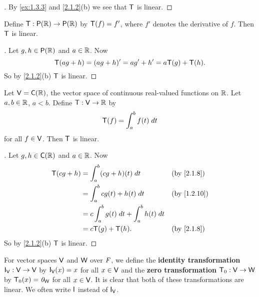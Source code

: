 \begin{proof}[]
  By \cref{ex:1.3.3} and \cref{2.1.2}(b) we see that \(\mathsf{T}\) is linear.
\end{proof}

\begin{eg}\label{2.1.7}
  Define \(\T : \ps{\R} \to \ps{\R}\) by \(\mathsf{T}(f) = f'\), where \(f'\) denotes the derivative of \(f\).
  Then \(\mathsf{T}\) is linear.
\end{eg}

\begin{proof}[]
  Let \(g, h \in \ps{\R}\) and \(a \in \mathbb{R}\).
  Now
  \[
    \mathsf{T}(ag + h) = (ag + h)' = ag' + h' = a\mathsf{T}(g) + \mathsf{T}(h).
  \]
  So by \cref{2.1.2}(b) \(\mathsf{T}\) is linear.
\end{proof}

\begin{eg}\label{2.1.8}
  Let \(\V = \cfs(\R)\), the vector space of continuous real-valued functions on \(\mathbb{R}\).
  Let \(a, b \in \mathbb{R}\), \(a < b\).
  Define \(\mathsf{T} : \mathsf{V} \to \mathbb{R}\) by
  \[
    \mathsf{T}(f) = \int_a^b f(t) \; dt
  \]
  for all \(f \in \mathsf{V}\).
  Then \(\mathsf{T}\) is linear.
\end{eg}

\begin{proof}[]
  Let \(g, h \in \cfs(\R)\) and \(a \in \mathbb{R}\).
  Now
  \begin{align*}
    \T(cg + h) & = \int_a^b (cg + h)(t) \; dt                  &  & \by{2.1.8}  \\
               & = \int_a^b cg(t) + h(t) \; dt                 &  & \by{1.2.10} \\
               & = c \int_a^b g(t) \; dt + \int_a^b h(t) \; dt                  \\
               & = c \T(g) + \T(h).                            &  & \by{2.1.8}
  \end{align*}
  So by \cref{2.1.2}(b) \(\mathsf{T}\) is linear.
\end{proof}

\begin{eg}\label{2.1.9}
  For vector spaces \(\mathsf{V}\) and \(\mathsf{W}\) over \(\mathit{F}\), we define the \textbf{identity transformation} \(\IT[\V] : \V \to \V\) by \(\IT[\V](x) = x\) for all \(x \in \mathsf{V}\) and the \textbf{zero transformation} \(\mathsf{T}_0 : \mathsf{V} \to \mathsf{W}\) by \(\mathsf{T}_0(x) = \mathit{0}_{\mathsf{W}}\) for all \(x \in \mathsf{V}\).
  It is clear that both of these transformations are linear.
  We often write \(\IT\) instead of \(\IT[\V]\).
\end{eg}

